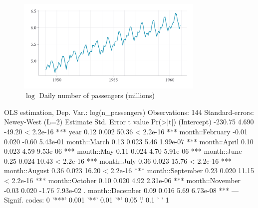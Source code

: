 \documentclass[12pt]{article}
\begin{document}
\newpage
\begin{figure}[h!]
  \caption{$\log$ Daily number of passengers (millions)}
  \label{fig:bitcoin}

  \vspace*{-2\bigskipamount}
  \begin{center}
  \includegraphics[width = 0.8\textwidth]{figures/log_n_passengers_airline.pdf}
  \end{center}
\end{figure}

\vspace*{-\bigskipamount}
\begin{codeblock}[{}]
OLS estimation, Dep. Var.: log(n_passengers)
Observations: 144
Standard-errors: Newey-West (L=2)
                  Estimate  Std. Error   t value   Pr(>|t|)
(Intercept)        -230.75       4.690    -49.20  < 2.2e-16 ***
year                  0.12       0.002     50.36  < 2.2e-16 ***
month::February      -0.01       0.020     -0.60   5.43e-01
month::March          0.13       0.023      5.46   1.99e-07 ***
month::April          0.10       0.023      4.59   9.53e-06 ***
month::May            0.11       0.024      4.70   5.91e-06 ***
month::June           0.25       0.024     10.43  < 2.2e-16 ***
month::July           0.36       0.023     15.76  < 2.2e-16 ***
month::August         0.36       0.023     16.20  < 2.2e-16 ***
month::September      0.23       0.020     11.15  < 2.2e-16 ***
month::October        0.10       0.020      4.92   2.31e-06 ***
month::November      -0.03       0.020     -1.76   7.93e-02 .
month::December       0.09       0.016      5.69   6.73e-08 ***
---
Signif. codes:  0 '***' 0.001 '**' 0.01 '*' 0.05 '.' 0.1 ' ' 1
\end{codeblock}
\end{document}
